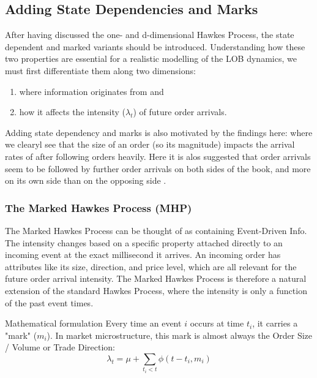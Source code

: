 \documentclass[12pt,a4paper]{cau_thesis}
\begin{document}
\subsection{Adding State Dependencies and Marks}\label{sub_sec:adding_state_dependencies_and_marks}
After having discussed the one- and d-dimensional Hawkes Process, the
state dependent and marked variants should be introduced.
Understanding how these two properties are essential for a realistic
modelling of the LOB dynamics, we must first differentiate them along
two dimensions:
\begin{enumerate}
    \item where information originates from and
    \item how it affects the intensity ($\lambda_{t}$) of future order
          arrivals.
\end{enumerate}

Adding state dependency and marks is also motivated by the findings
here: \cite[see ][, p.83]{cartea2015algorithmic} where we clearyl see
that the size of an order (so its magnitude) impacts the arrival
rates of after following orders heavily. Here it is alos suggested
that order arrivals seem to be followed by further order arrivals on
both sides of the book, and more on its own side than on the opposing
side \cite[see ][, p.83]{cartea2015algorithmic}.

\subsubsection{The Marked Hawkes Process (MHP)}\label{sub_sub_sec:the_marked_hawkes_process}
The Marked Hawkes Process can be thought of as containing
Event-Driven Info. The intensity changes based on a specific property
attached directly to an incoming event at the exact millisecond it
arrives. An incoming order has attributes like its size, direction,
and price level, which are all relevant for the future order arrival
intensity. The Marked Hawkes Process is therefore a natural extension
of the standard Hawkes Process, where the intensity is only a
function of the past event times.

\begin{paragraph}{Mathematical formulation}
    Every time an event \(i\) occurs at time
    \(t_{i}\), it carries a "mark" (\(m_{i}\)). In market microstructure,
    this mark is almost always the Order Size / Volume or Trade
    Direction:
    \begin{equation}
        \lambda_{t} = \mu + \sum_{t_{i}<t} \phi(t-t_{i}, m_{i})
    \end{equation}
\end{paragraph}
\end{document}
